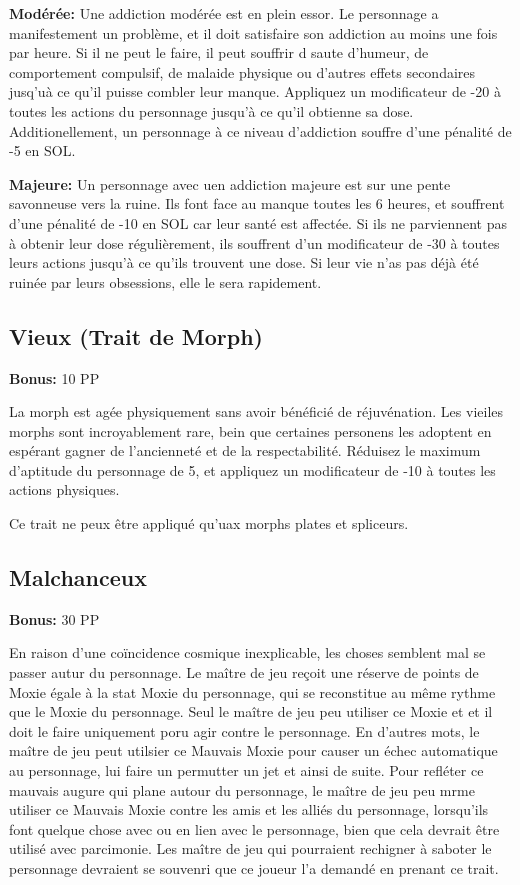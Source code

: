 \textbf{Modérée:} Une addiction modérée est en plein essor. Le personnage a manifestement un problème, et il doit satisfaire son addiction au moins une fois par heure. Si il ne peut le faire, il peut souffrir d saute d'humeur, de comportement compulsif, de malaide physique ou d'autres effets secondaires jusq'uà ce qu'il puisse combler leur manque. Appliquez un modificateur de -20 à toutes les actions du personnage jusqu'à ce qu'il obtienne sa dose. Additionellement, un personnage à ce niveau d'addiction souffre d'une pénalité de -5 en SOL. 

\textbf{Majeure:} Un personnage avec uen addiction majeure est sur une pente savonneuse vers la ruine. Ils font face au manque toutes les 6 heures, et souffrent d'une pénalité de -10 en SOL car leur santé est affectée. Si ils ne parviennent pas à obtenir leur dose régulièrement, ils souffrent d'un modificateur de -30 à toutes leurs actions jusqu'à ce qu'ils trouvent une dose. Si leur vie n'as pas déjà été ruinée par leurs obsessions, elle le sera rapidement. 

\subsection{Vieux (Trait de Morph)} \textbf{Bonus:} 10 PP 

La morph est agée physiquement sans avoir bénéficié de réjuvénation. Les vieiles morphs sont incroyablement rare, bein que certaines personens les adoptent en espérant gagner de l'ancienneté et de la respectabilité. Réduisez le maximum d'aptitude du personnage de 5, et appliquez un modificateur de -10 à toutes les actions physiques. 

Ce trait ne peux être appliqué qu'uax morphs plates et spliceurs. 

\subsection{Malchanceux} \label{sec:traits-bad-luck} 

\textbf{Bonus:} 30 PP 

En raison d'une coïncidence cosmique inexplicable, les choses semblent mal se passer autur du personnage. Le maître de jeu reçoit une réserve de points de Moxie égale à la stat Moxie du personnage, qui se reconstitue au même rythme que le Moxie du personnage. Seul le maître de jeu peu utiliser ce Moxie et et il doit le faire uniquement poru agir contre le personnage. En d'autres mots, le maître de jeu peut utilsier ce Mauvais Moxie pour causer un échec automatique au personnage, lui faire un permutter un jet et ainsi de suite. Pour refléter ce mauvais augure qui plane autour du personnage, le maître de jeu peu mrme utiliser ce Mauvais Moxie contre les amis et les alliés du personnage, lorsqu'ils font quelque chose avec ou en lien avec le personnage, bien que cela devrait être utilisé avec parcimonie. Les maître de jeu qui pourraient rechigner à saboter le personnage devraient se souvenri que ce joueur l'a demandé en prenant ce trait. 





